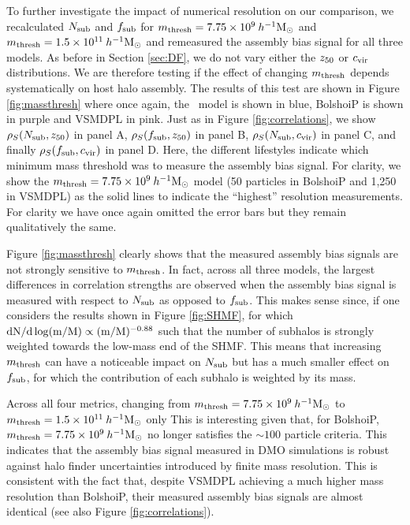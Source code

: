 \documentclass[twocolumn,apj,numberedappendix,twocolappendix,iop]{openjournal}
\begin{document}
To further investigate the impact of numerical resolution on our comparison, we recalculated $N_{\rm sub}$ and $f_{\rm sub}$ for $m_{\rm thresh} = 7.75 \times 10^{9} \>h^{-1}\rm M_\odot$ and $m_{\rm thresh} = 1.5 \times 10^{11} \>h^{-1}\rm M_\odot$ and remeasured the assembly bias signal for all three models. As before in Section \ref{sec:DF}, we do not vary either the $z_{50}$ or $c_{\rm vir}$ distributions. We are therefore testing if the effect of changing $m_{\rm thresh}$ depends systematically on host halo assembly. The results of this test are shown in Figure \ref{fig:massthresh} where once again, the \SatGen\ model is shown in blue, BolshoiP is shown in purple and VSMDPL in pink. Just as in Figure \ref{fig:correlations}, we show $\rho_S(N_{\rm sub}, z_{50})$ in panel A, $\rho_S(f_{\rm sub}, z_{50})$ in panel B, $\rho_S(N_{\rm sub}, c_{\rm vir})$ in panel C, and finally $\rho_S(f_{\rm sub}, c_{\rm vir})$ in panel D. Here, the different lifestyles indicate which minimum mass threshold was to measure the assembly bias signal. For clarity, we show the $m_{\rm thresh} = 7.75 \times 10^{9} \>h^{-1}\rm M_\odot$ model (50 particles in BolshoiP and 1,250 in VSMDPL) as the solid lines to indicate the ``highest'' resolution measurements. For clarity we have once again omitted the error bars but they remain qualitatively the same.

Figure \ref{fig:massthresh} clearly shows that the measured assembly bias signals are not strongly sensitive to $m_{\rm thresh}$. In fact, across all three models, the largest differences in correlation strengths are observed when the assembly bias signal is measured with respect to $N_{\rm sub}$ as opposed to $f_{\rm sub}$. This makes sense since, if one considers the results shown in Figure \ref{fig:SHMF}, for which $\rm{d}N / \rm{d}\log(m/M) \propto (m/M)^{-0.88}$ such that the number of subhalos is strongly weighted towards the low-mass end of the SHMF. This means that increasing $m_{\rm thresh}$ can have a noticeable impact on $N_{\rm sub}$ but has a much smaller effect on $f_{\rm sub}$, for which the contribution of each subhalo is weighted by its mass. 

Across all four metrics, changing from $m_{\rm thresh} = 7.75 \times 10^{9} \>h^{-1}\rm M_\odot$ to $m_{\rm thresh} = 1.5 \times 10^{11} \>h^{-1}\rm M_\odot$ only   This is interesting given that, for BolshoiP, $m_{\rm thresh} = 7.75 \times 10^{9} \>h^{-1}\rm M_\odot$ no longer satisfies the $\sim 100$ particle criteria. This indicates that the assembly bias signal measured in DMO simulations is robust against halo finder uncertainties introduced by finite mass resolution. This is consistent with the fact that, despite VSMDPL achieving a much higher mass resolution than BolshoiP, their measured assembly bias signals are almost identical (see also Figure \ref{fig:correlations}).
\end{document}

